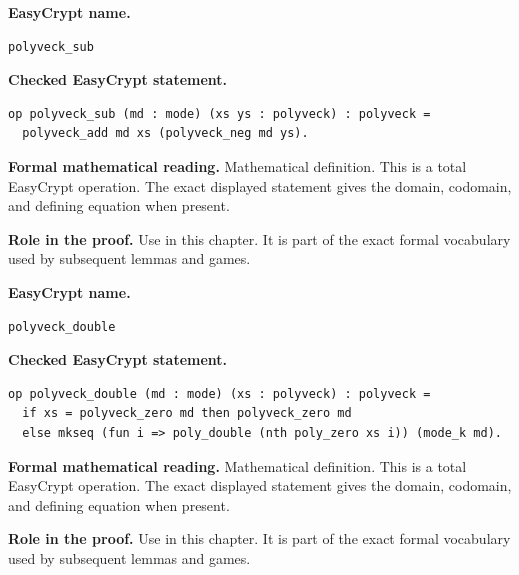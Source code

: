 \begin{formaldefinition}
\noindent\textbf{EasyCrypt name.}
\begin{lstlisting}[language=EasyCrypt,basicstyle=\ttfamily\scriptsize]
polyveck_sub
\end{lstlisting}
\noindent\textbf{Checked EasyCrypt statement.}
\begin{lstlisting}[language=EasyCrypt,basicstyle=\ttfamily\scriptsize]
op polyveck_sub (md : mode) (xs ys : polyveck) : polyveck =
  polyveck_add md xs (polyveck_neg md ys).
\end{lstlisting}
\noindent\textbf{Formal mathematical reading.}
Mathematical definition. This is a total EasyCrypt operation.  The exact displayed statement gives the domain, codomain, and defining equation when present.

\noindent\textbf{Role in the proof.}
Use in this chapter. It is part of the exact formal vocabulary used by subsequent lemmas and games.

\end{formaldefinition}

\begin{formaldefinition}
\noindent\textbf{EasyCrypt name.}
\begin{lstlisting}[language=EasyCrypt,basicstyle=\ttfamily\scriptsize]
polyveck_double
\end{lstlisting}
\noindent\textbf{Checked EasyCrypt statement.}
\begin{lstlisting}[language=EasyCrypt,basicstyle=\ttfamily\scriptsize]
op polyveck_double (md : mode) (xs : polyveck) : polyveck =
  if xs = polyveck_zero md then polyveck_zero md
  else mkseq (fun i => poly_double (nth poly_zero xs i)) (mode_k md).
\end{lstlisting}
\noindent\textbf{Formal mathematical reading.}
Mathematical definition. This is a total EasyCrypt operation.  The exact displayed statement gives the domain, codomain, and defining equation when present.

\noindent\textbf{Role in the proof.}
Use in this chapter. It is part of the exact formal vocabulary used by subsequent lemmas and games.

\end{formaldefinition}

